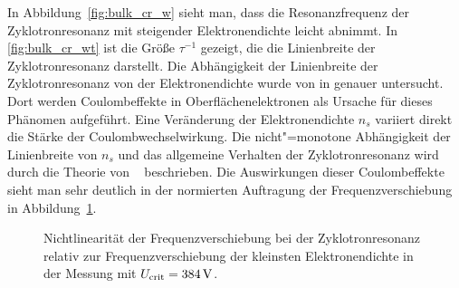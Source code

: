 In Abbildung~\ref{fig:bulk_cr_w} sieht man, dass die Resonanzfrequenz der Zyklotronresonanz mit steigender Elektronendichte leicht abnimmt. In \ref{fig:bulk_cr_wt} ist die Größe $\tau^{-1}$ gezeigt, die die Linienbreite der Zyklotronresonanz darstellt.
Die Abhängigkeit der Linienbreite der Zyklotronresonanz von der Elektronendichte wurde von  in \cite{ekkehard} genauer untersucht. Dort werden Coulombeffekte in Oberflächenelektronen als Ursache für dieses Phänomen aufgeführt. Eine Veränderung der Elektronendichte $n_s$ variiert direkt die Stärke der Coulombwechselwirkung. Die nicht"=monotone Abhängigkeit der Linienbreite von $n_s$ und das allgemeine Verhalten der Zyklotronresonanz wird durch die Theorie von  \ea\ \cite{Mon02} beschrieben. Die Auswirkungen dieser Coulombeffekte sieht man sehr deutlich in der normierten Auftragung der Frequenzverschiebung in Abbildung~\ref{fig:bulk_cr_nonlinear}.

\begin{figure}[h!tbp]    \hfill%
    \begin{minipage}[b]{\textwidth-\smallwidth-\tabcolsep}
        \caption[Nichtlinearität der Frequenzverschiebung]{Nichtlinearität der Frequenzverschiebung bei der Zyklotronresonanz relativ zur Frequenzverschiebung der kleinsten Elektronendichte in der Messung mit $U_\text{crit}=\unit[384]{V}$.}
        \label{fig:bulk_cr_nonlinear}
    \end{minipage}
\end{figure}
